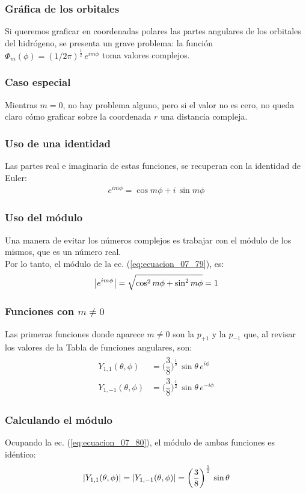 \documentclass[12pt]{beamer}
\begin{document}
\begin{frame}
\frametitle{Gráfica de los orbitales}
Si queremos graficar en coordenadas polares las partes angulares de los orbitales del hidrógeno, \pause se presenta un grave problema: la función $\Phi_{m} (\phi) = (1/2 \pi)^{\frac{1}{2}} \, e^{i m \phi}$ toma valores complejos.
\end{frame}
\begin{frame}
\frametitle{Caso especial}
Mientras $m = 0$, no hay problema alguno, \pause pero si el valor no es cero, no queda claro cómo graficar sobre la coordenada $r$ una distancia compleja.
\end{frame}
\begin{frame}
\frametitle{Uso de una identidad}
Las partes real e imaginaria de estas funciones, se recuperan con la identidad de Euler:
\pause
\begin{align}
e^{i m \phi} = \cos m \phi + i \, \sin m \phi
\label{eq:ecuacion_07_79}
\end{align}
\end{frame}
\begin{frame}
\frametitle{Uso del módulo}
Una manera de evitar los números complejos es trabajar con el módulo de los mismos, que es un número real.
\\
\bigskip
\pause
Por lo tanto, el módulo de la ec. (\ref{eq:ecuacion_07_79}), es:
\pause
\begin{align}
\abs{e^{i m \phi}} = \sqrt{ \cos^{2} m \phi + \sin^{2} m \phi} = 1
\label{eq:ecuacion_07_80}
\end{align}
\end{frame}
\begin{frame}
\frametitle{Funciones con $m \neq 0$}
Las primeras funciones donde aparece $m \neq 0$ \pause son la $p_{+1}$ y la $p_{-1}$ que, al revisar los valores de la Tabla de funciones angulares, son:
\pause
\begin{eqnarray}
\begin{aligned}
Y_{1, 1} (\theta, \phi) &= \bigg( \dfrac{3}{8} \bigg)^{\frac{1}{2}} \, \sin \theta \, e^{i \phi} \label{eq:ecuacion_07_81} \\[0.5em]
Y_{1, -1} (\theta, \phi) &= \bigg( \dfrac{3}{8} \bigg)^{\frac{1}{2}} \, \sin \theta \, e^{-i \phi} 
\end{aligned}
\label{eq:ecuacion_07_82}
\end{eqnarray}
\end{frame}
\begin{frame}
\frametitle{Calculando el módulo}
Ocupando la ec. (\ref{eq:ecuacion_07_80}), el módulo de ambas funciones es idéntico:
\pause
\begin{align}
\abs{Y_{1, 1} (\theta, \phi)} = \abs{Y_{1, -1} (\theta, \phi)} = \bigg( \dfrac{3}{8} \bigg)^{\frac{1}{2}} \, \sin \theta
\label{eq:ecuacion_07_83}
\end{align}
\end{frame}
\end{document}
